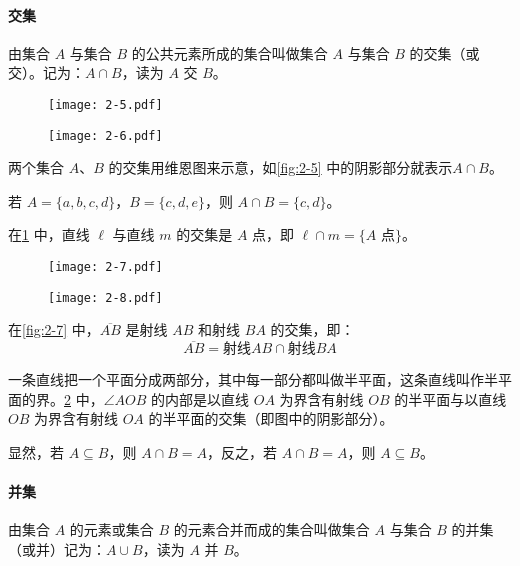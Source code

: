 \paragraph{交集}
由集合 $A$ 与集合 $B$ 的公共元素所成的集合叫做集合 $A$ 与集合 $B$ 的交集（或交）。记为：$A\cap B$，读为 $A$ 交 $B$。
\begin{figure}
	\begin{minipage}[b]{0.48\linewidth}
		\centering
		\texttt{[image: 2-5.pdf]}
		\caption{}\label{fig:2-5}
	\end{minipage}
	\begin{minipage}[b]{0.48\linewidth}
		\centering
		\texttt{[image: 2-6.pdf]}
		\caption{}\label{fig:2-6}
	\end{minipage}
\end{figure}

两个集合 $A$、$B$ 的交集用维恩图来示意，如\cref{fig:2-5} 中的阴影部分就表示$A\cap B$。

若 $A=\{ a, b, c, d \}$，$B=\{ c, d, e\}$，则 $A\cap B=\{c,d\}$。

在\cref{fig:2-6} 中，直线 $\ell$ 与直线 $m$ 的交集是 $A$ 点，即 $\ell \cap m=\{A\text{ 点}\}$。
\begin{figure}
	\begin{minipage}[b]{0.48\linewidth}
		\centering
		\texttt{[image: 2-7.pdf]}
		\caption{}\label{fig:2-7}
	\end{minipage}
	\begin{minipage}[b]{0.48\linewidth}
		\centering
		\texttt{[image: 2-8.pdf]}
		\caption{}\label{fig:2-8}
	\end{minipage}
\end{figure}

在\cref{fig:2-7} 中，$\overline{AB}$ 是射线 $AB$ 和射线 $BA$ 的交集，即：
\[\overline{AB}=\text{射线}AB\cap \text{射线}BA\]

一条直线把一个平面分成两部分，其中每一部分都叫做半平面，这条直线叫作半平面的界。\cref{fig:2-8} 中，$\angle AOB$ 的内部是以直线 $OA$ 为界含有射线 $OB$ 的半平面与以直线 $OB$ 为界含有射线 $OA$ 的半平面的交集（即图中的阴影部分）。

显然，若 $A\subseteq B$，则 $A\cap B=A$，反之，若 $A\cap B=A$，则 $A\subseteq B$。

\paragraph{并集}
由集合 $A$ 的元素或集合 $B$ 的元素合并而成的集合叫做集合 $A$ 与集合 $B$ 的并集（或并）记为：$A\cup B$，读为 $A$ 并 $B$。

